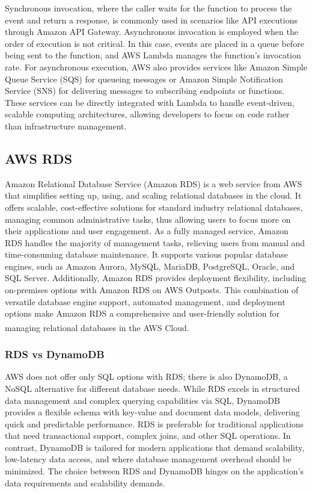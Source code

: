 Synchronous invocation, where the caller waits for the function to process the event and return a
response, is commonly used in scenarios like API executions through Amazon API Gateway. Asynchronous
invocation is employed when the order of execution is not critical. In this case, events are placed
in a queue before being sent to the function, and AWS Lambda manages the function's invocation rate.
For asynchronous execution, AWS also provides services like Amazon Simple Queue Service (SQS) for
queueing messages or Amazon Simple Notification Service (SNS) for delivering messages to subscribing
endpoints or functions. These services can be directly integrated with Lambda to handle
event-driven, scalable computing architectures, allowing developers to focus on code rather than
infrastructure management.

\subsection{AWS RDS}
Amazon Relational Database Service (Amazon RDS) is a web service from AWS that simplifies setting
up, using, and scaling relational databases in the cloud. It offers scalable, cost-effective
solutions for standard industry relational databases, managing common administrative tasks, thus
allowing users to focus more on their applications and user engagement. As a fully managed service,
Amazon RDS handles the majority of management tasks, relieving users from manual and time-consuming
database maintenance. It supports various popular database engines, such as Amazon Aurora, MySQL,
MariaDB, PostgreSQL, Oracle, and SQL Server. Additionally, Amazon RDS provides deployment
flexibility, including on-premises options with Amazon RDS on AWS Outposts. This combination of
versatile database engine support, automated management, and deployment options make Amazon RDS a
comprehensive and user-friendly solution for managing relational databases in the AWS
Cloud\textsuperscript{\cite{tech_4}}.

\subsubsection{RDS vs DynamoDB}
AWS does not offer only SQL options with RDS; there is also DynamoDB, a NoSQL alternative for
different database needs. While RDS excels in structured data management and complex querying
capabilities via SQL, DynamoDB provides a flexible schema with key-value and document data models,
delivering quick and predictable performance. RDS is preferable for traditional applications that
need transactional support, complex joins, and other SQL operations. In contrast, DynamoDB is
tailored for modern applications that demand scalability, low-latency data access, and where
database management overhead should be minimized. The choice between RDS and DynamoDB hinges on the
application's data requirements and scalability demands.

